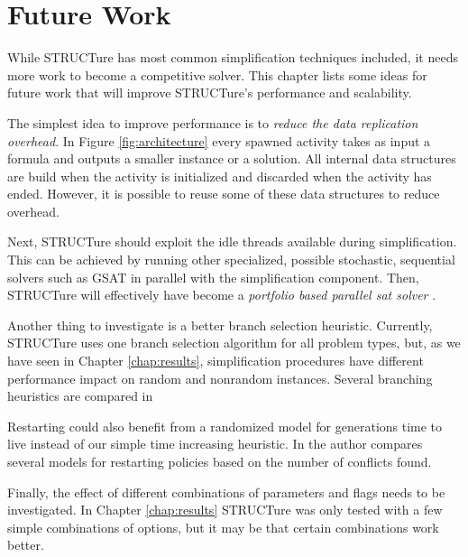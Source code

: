 \chapter{Future Work}
\label{chap:future}

While STRUCTure has most common simplification techniques included,
it needs more work to become a competitive solver. This chapter
lists some ideas for future work that will improve STRUCTure's
performance and scalability.

The simplest idea to improve performance is to \emph{reduce the data
replication overhead}. In Figure \ref{fig:architecture} every spawned
activity takes as input a formula and outputs a smaller instance or a
solution. All internal data structures are build when the activity is
initialized and discarded when the activity has ended. However, it is
possible to reuse some of these data structures to reduce overhead.

Next, STRUCTure should exploit the idle threads available
during simplification. This can be achieved by running other
specialized, possible stochastic, sequential solvers such as GSAT
\cite{Selman92anew} in parallel with the simplification component.
Then, STRUCTure will effectively have become a \emph{portfolio
based parallel sat solver} \cite{5547119}.

Another thing to investigate is a better branch selection heuristic.
Currently, STRUCTure uses one branch selection algorithm for all
problem types, but, as we have seen in Chapter \ref{chap:results},
simplification procedures have different performance impact on
random and nonrandom instances. Several branching heuristics 
are compared in \cite{Marques-silva99theimpact}

Restarting could also benefit from a randomized model for generations
time to live instead of our simple time increasing heuristic. In
\cite{Huang:2007:ERE:1625275.1625649} the author compares several
models for restarting policies based on the number of conflicts
found.

Finally, the effect of different combinations of parameters and
flags needs to be investigated. In Chapter \ref{chap:results}
STRUCTure was only tested with a few simple combinations of options,
but it may be that certain combinations work better.

